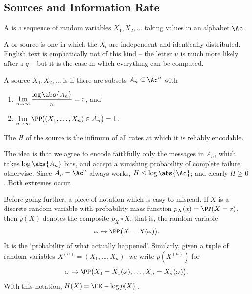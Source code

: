 \subsection{Sources and Information Rate}

\begin{definition}[Source]
	A  is a sequence of random variables $X_1, X_2, \dots$ taking values in an alphabet $\Ac$.
\end{definition}

\begin{example}
	A  or  source is one in which the $X_i$ are independent and identically distributed. English text is emphatically not of this kind -- the letter $u$ is much more likely after a $q$ -- but it is the case in which everything can be computed.
\end{example}

\begin{definition}
	A source $X_1, X_2, \dots$ is  if there are subsets $A_n \subseteq \Ac^n$ with
	\begin{enumerate}[label=(\roman*)]
		\item $\displaystyle \lim_{n\to\infty} \frac{\log \abs{A_n}}{n} = r$, and
		\item $\displaystyle \lim_{n\to\infty} \PP\bigl((X_1,\dots,X_n) \in A_n\bigr) = 1$.
	\end{enumerate}
	The  $H$ of the source is the infimum of all rates at which it is reliably encodable.
\end{definition}

The idea is that we agree to encode faithfully only the messages in $A_n$, which takes $\log\abs{A_n}$ bits, and accept a vanishing probability of complete failure otherwise. Since $A_n = \Ac^n$ always works, $H \le \log\abs{\Ac}$; and clearly $H \ge 0$. Both extremes occur.

Before going further, a piece of notation which is easy to misread. If $X$ is a discrete random variable with probability mass function $p_X(x) = \PP(X = x)$, then $p(X)$ denotes the composite $p_X \circ X$, that is, the random variable
$$\omega \mapsto \PP\bigl(X = X(\omega)\bigr).$$
It is the `probability of what actually happened'. Similarly, given a tuple of random variables $X^{(n)} = (X_1, \dots, X_n)$, we write $p(X^{(n)})$ for
$$\omega \mapsto \PP\bigl(X_1 = X_1(\omega), \dots, X_n = X_n(\omega)\bigr).$$
With this notation, $H(X) = \EE[-\log p(X)]$.

